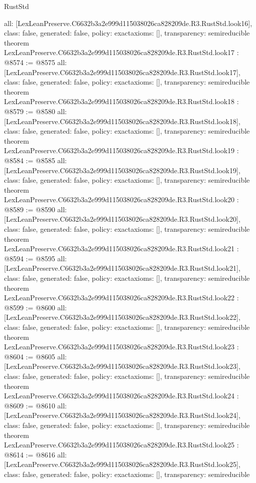 \begin{lexlean}{RustStd}
\begin{coremodule}
{  all: [LexLeanPreserve.C6632b3a2e999d115038026ca828209de.R3.RustStd.look16],
  class: false,
  generated: false,
  policy: exact{axioms: []},
  transparency: semireducible
}
theorem LexLeanPreserve.C6632b3a2e999d115038026ca828209de.R3.RustStd.look17 : @8574 := @8575 {
  all: [LexLeanPreserve.C6632b3a2e999d115038026ca828209de.R3.RustStd.look17],
  class: false,
  generated: false,
  policy: exact{axioms: []},
  transparency: semireducible
}
theorem LexLeanPreserve.C6632b3a2e999d115038026ca828209de.R3.RustStd.look18 : @8579 := @8580 {
  all: [LexLeanPreserve.C6632b3a2e999d115038026ca828209de.R3.RustStd.look18],
  class: false,
  generated: false,
  policy: exact{axioms: []},
  transparency: semireducible
}
theorem LexLeanPreserve.C6632b3a2e999d115038026ca828209de.R3.RustStd.look19 : @8584 := @8585 {
  all: [LexLeanPreserve.C6632b3a2e999d115038026ca828209de.R3.RustStd.look19],
  class: false,
  generated: false,
  policy: exact{axioms: []},
  transparency: semireducible
}
theorem LexLeanPreserve.C6632b3a2e999d115038026ca828209de.R3.RustStd.look20 : @8589 := @8590 {
  all: [LexLeanPreserve.C6632b3a2e999d115038026ca828209de.R3.RustStd.look20],
  class: false,
  generated: false,
  policy: exact{axioms: []},
  transparency: semireducible
}
theorem LexLeanPreserve.C6632b3a2e999d115038026ca828209de.R3.RustStd.look21 : @8594 := @8595 {
  all: [LexLeanPreserve.C6632b3a2e999d115038026ca828209de.R3.RustStd.look21],
  class: false,
  generated: false,
  policy: exact{axioms: []},
  transparency: semireducible
}
theorem LexLeanPreserve.C6632b3a2e999d115038026ca828209de.R3.RustStd.look22 : @8599 := @8600 {
  all: [LexLeanPreserve.C6632b3a2e999d115038026ca828209de.R3.RustStd.look22],
  class: false,
  generated: false,
  policy: exact{axioms: []},
  transparency: semireducible
}
theorem LexLeanPreserve.C6632b3a2e999d115038026ca828209de.R3.RustStd.look23 : @8604 := @8605 {
  all: [LexLeanPreserve.C6632b3a2e999d115038026ca828209de.R3.RustStd.look23],
  class: false,
  generated: false,
  policy: exact{axioms: []},
  transparency: semireducible
}
theorem LexLeanPreserve.C6632b3a2e999d115038026ca828209de.R3.RustStd.look24 : @8609 := @8610 {
  all: [LexLeanPreserve.C6632b3a2e999d115038026ca828209de.R3.RustStd.look24],
  class: false,
  generated: false,
  policy: exact{axioms: []},
  transparency: semireducible
}
theorem LexLeanPreserve.C6632b3a2e999d115038026ca828209de.R3.RustStd.look25 : @8614 := @8616 {
  all: [LexLeanPreserve.C6632b3a2e999d115038026ca828209de.R3.RustStd.look25],
  class: false,
  generated: false,
  policy: exact{axioms: []},
  transparency: semireducible
}
\end{coremodule}
\end{lexlean}
